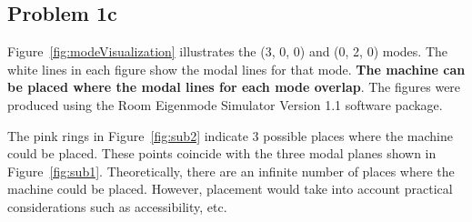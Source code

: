 {\subsection*{Problem 1c}

Figure~\ref{fig:modeVisualization} illustrates the (3, 0, 0) and (0, 2, 0) modes.  The white lines in each figure show the modal lines for that mode.  \textbf{The machine can be placed where the modal lines for each mode overlap}.  The figures were produced using the Room Eigenmode Simulator Version 1.1 software package.

The pink rings in Figure~\ref{fig:sub2} indicate 3 possible places where the machine could be placed.  These points coincide with the three modal planes shown in Figure~\ref{fig:sub1}.  Theoretically, there are an infinite number of places where the machine could be placed.  However, placement would take into account practical considerations such as accessibility, etc.


}
